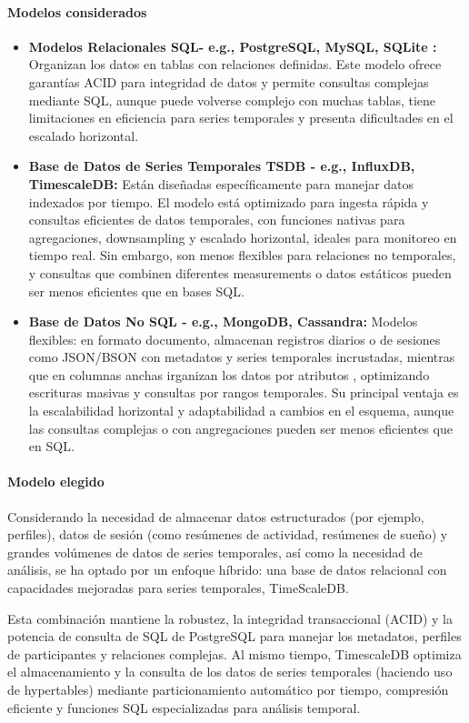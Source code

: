 \paragraph{\textbf{Modelos considerados}}
\begin{itemize}
    \item \textbf{Modelos Relacionales SQL- e.g., PostgreSQL, MySQL, SQLite :} Organizan los datos en tablas con relaciones definidas. Este modelo ofrece garantías ACID para integridad de datos y permite consultas complejas mediante SQL, aunque puede volverse complejo con muchas tablas, tiene limitaciones en eficiencia para series temporales y presenta dificultades en el escalado horizontal.
    \item \textbf{Base de Datos de Series Temporales TSDB - e.g., InfluxDB, TimescaleDB:} Están diseñadas específicamente para manejar datos indexados por tiempo. El modelo está optimizado para ingesta rápida y consultas eficientes de datos temporales, con funciones nativas para agregaciones, downsampling y escalado horizontal, ideales para monitoreo en tiempo real. Sin embargo, son menos flexibles para relaciones no temporales, y consultas que combinen diferentes measurements o datos estáticos pueden ser menos eficientes que en bases SQL.   
    \item \textbf{Base de Datos No SQL - e.g., MongoDB, Cassandra:} Modelos flexibles: en formato documento, almacenan registros diarios o de sesiones como JSON/BSON con metadatos y series temporales incrustadas, mientras que en columnas anchas irganizan los datos por atributos , optimizando escrituras masivas y consultas por rangos temporales. Su principal ventaja es la escalabilidad horizontal y adaptabilidad a cambios en el esquema, aunque las consultas complejas o con angregaciones pueden ser menos eficientes que en SQL.
\end{itemize}

\paragraph{\textbf{Modelo elegido}} 
Considerando la necesidad de almacenar datos estructurados (por ejemplo, perfiles), datos de sesión (como resúmenes de actividad, resúmenes de sueño) y grandes volúmenes de datos de series temporales, así como la necesidad de análisis, se ha optado por un enfoque híbrido: una base de datos relacional con capacidades mejoradas para series temporales, TimeScaleDB.


Esta combinación mantiene la robustez, la integridad transaccional (ACID) y la potencia de consulta de SQL de PostgreSQL para manejar los metadatos, perfiles de participantes y relaciones complejas. Al mismo tiempo, TimescaleDB optimiza el almacenamiento y la consulta de los datos de series temporales (haciendo uso de hypertables) mediante particionamiento automático por tiempo, compresión eficiente y funciones SQL especializadas para análisis temporal. 

